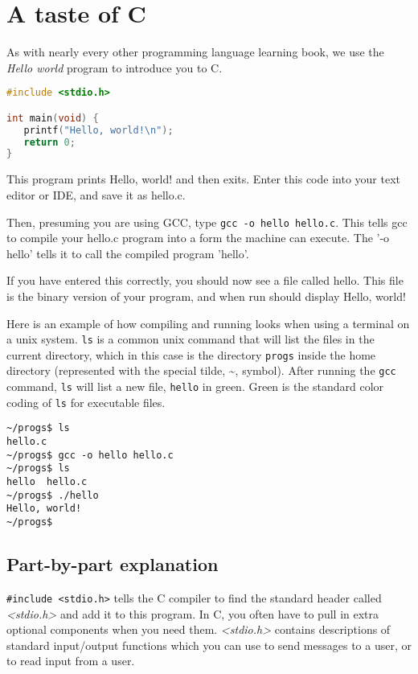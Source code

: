 \section{A taste of C}
As with nearly every other programming language learning book, we use the
\emph{Hello world} program to introduce you to C.

\lstset{basicstyle=\scriptsize, numbers=left, captionpos=b, tabsize=4}
\begin{lstlisting}[caption={Section \thesection listing  \arabic{lstcnta}},language={C},
breaklines=true,xleftmargin=15pt,label=lst:section\thesection \arabic{lstcnta}]
#include <stdio.h>

int main(void) {
   printf("Hello, world!\n");
   return 0;
}
\end{lstlisting}

This program prints Hello, world! and then exits.
Enter this code into your text editor or IDE, and save it as hello.c.

Then, presuming you are using GCC, type \texttt{gcc -o hello hello.c}. This
tells gcc to compile your hello.c program into a form the machine can execute.
The '-o hello' tells it to call the compiled program 'hello'.

If you have entered this correctly, you should now see a file called hello.
This file is the binary version of your program, and when run should display
Hello, world!

Here is an example of how compiling and running looks when using a terminal on
a unix system. \texttt{ls} is a common unix command that will list the files in
the current directory, which in this case is the directory \texttt{progs}
inside the home directory (represented with the special tilde, \~{}, symbol).
After running the \texttt{gcc} command, \texttt{ls} will list a new file,
\texttt{hello} in green. Green is the standard color coding of \texttt{ls} for
executable files. 

\begin{verbatim}
~/progs$ ls
hello.c
~/progs$ gcc -o hello hello.c
~/progs$ ls
hello  hello.c
~/progs$ ./hello
Hello, world!
~/progs$
\end{verbatim}

\subsection{Part-by-part explanation}
\texttt{\#include \textless{}stdio.h\textgreater{}} tells the C compiler to
find the standard header called \emph{\textless{stdio.h\textgreater{}}} and add
it to this program. In C, you often have to pull in extra optional components
when you need them. \emph{\textless{}stdio.h\textgreater{}} contains
descriptions of standard input/output functions which you can use to send
messages to a user, or to read input from a user.

